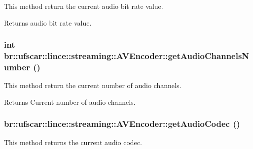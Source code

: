 This method return the current audio bit rate value. 

\begin{DoxyReturn}{Returns}
audio bit rate value. 
\end{DoxyReturn}
\hypertarget{classbr_1_1ufscar_1_1lince_1_1streaming_1_1AVEncoder_afa7947bc43d68e09a2fb206d2d15a33f}{
\subsubsection[{getAudioChannelsNumber}]{\setlength{\rightskip}{0pt plus 5cm}int br::ufscar::lince::streaming::AVEncoder::getAudioChannelsNumber ()}}
\label{classbr_1_1ufscar_1_1lince_1_1streaming_1_1AVEncoder_afa7947bc43d68e09a2fb206d2d15a33f}


This method return the current number of audio channels. 

\begin{DoxyReturn}{Returns}
Current number of audio channels. 
\end{DoxyReturn}
\hypertarget{classbr_1_1ufscar_1_1lince_1_1streaming_1_1AVEncoder_a8bd91b18ccc4f8ae05cccd5540714b00}{
\subsubsection[{getAudioCodec}]{ br::ufscar::lince::streaming::AVEncoder::getAudioCodec ()}}
\label{classbr_1_1ufscar_1_1lince_1_1streaming_1_1AVEncoder_a8bd91b18ccc4f8ae05cccd5540714b00}


This method returns the current audio codec. 

